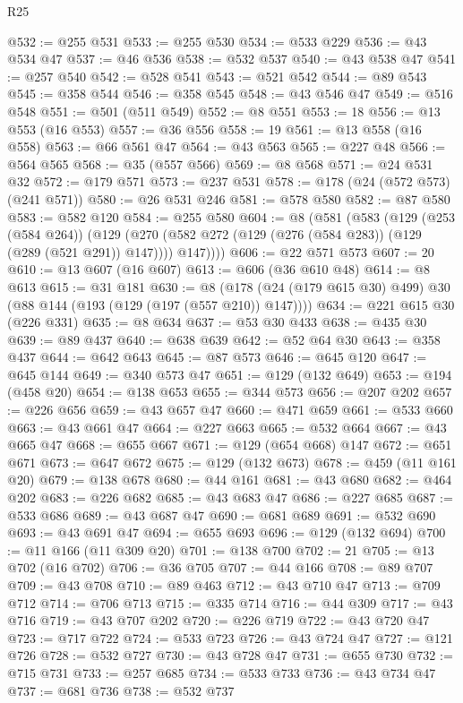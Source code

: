 \begin{lexlean}{R25}
\begin{coremodule}
@532 := @255 @531
@533 := @255 @530
@534 := @533 @229
@536 := @43 @534 @47
@537 := @46 @536
@538 := @532 @537
@540 := @43 @538 @47
@541 := @257 @540
@542 := @528 @541
@543 := @521 @542
@544 := @89 @543
@545 := @358 @544
@546 := @358 @545
@548 := @43 @546 @47
@549 := @516 @548
@551 := @501 (@511 @549)
@552 := @8 @551
@553 := 18
@556 := @13 @553 (@16 @553)
@557 := @36 @556
@558 := 19
@561 := @13 @558 (@16 @558)
@563 := @66 @561 @47
@564 := @43 @563
@565 := @227 @48
@566 := @564 @565
@568 := @35 (@557 @566)
@569 := @8 @568
@571 := @24 @531 @32
@572 := @179 @571
@573 := @237 @531
@578 := @178 (@24 (@572 @573) (@241 @571))
@580 := @26 @531 @246
@581 := @578 @580
@582 := @87 @580
@583 := @582 @120
@584 := @255 @580
@604 := @8
    (@581
      (@583
        (@129
          (@253 (@584 @264))
          (@129 (@270 (@582 @272 (@129 (@276 (@584 @283)) (@129 (@289 (@521 @291)) @147)))) @147))))
@606 := @22 @571 @573
@607 := 20
@610 := @13 @607 (@16 @607)
@613 := @606 (@36 @610 @48)
@614 := @8 @613
@615 := @31 @181
@630 := @8 (@178 (@24 (@179 @615 @30) @499) @30 (@88 @144 (@193 (@129 (@197 (@557 @210)) @147))))
@634 := @221 @615 @30 (@226 @331)
@635 := @8 @634
@637 := @53 @30 @433
@638 := @435 @30
@639 := @89 @437
@640 := @638 @639
@642 := @52 @64 @30
@643 := @358 @437
@644 := @642 @643
@645 := @87 @573
@646 := @645 @120
@647 := @645 @144
@649 := @340 @573 @47
@651 := @129 (@132 @649)
@653 := @194 (@458 @20)
@654 := @138 @653
@655 := @344 @573
@656 := @207 @202
@657 := @226 @656
@659 := @43 @657 @47
@660 := @471 @659
@661 := @533 @660
@663 := @43 @661 @47
@664 := @227 @663
@665 := @532 @664
@667 := @43 @665 @47
@668 := @655 @667
@671 := @129 (@654 @668) @147
@672 := @651 @671
@673 := @647 @672
@675 := @129 (@132 @673)
@678 := @459 (@11 @161 @20)
@679 := @138 @678
@680 := @44 @161
@681 := @43 @680
@682 := @464 @202
@683 := @226 @682
@685 := @43 @683 @47
@686 := @227 @685
@687 := @533 @686
@689 := @43 @687 @47
@690 := @681 @689
@691 := @532 @690
@693 := @43 @691 @47
@694 := @655 @693
@696 := @129 (@132 @694)
@700 := @11 @166 (@11 @309 @20)
@701 := @138 @700
@702 := 21
@705 := @13 @702 (@16 @702)
@706 := @36 @705
@707 := @44 @166
@708 := @89 @707
@709 := @43 @708
@710 := @89 @463
@712 := @43 @710 @47
@713 := @709 @712
@714 := @706 @713
@715 := @335 @714
@716 := @44 @309
@717 := @43 @716
@719 := @43 @707 @202
@720 := @226 @719
@722 := @43 @720 @47
@723 := @717 @722
@724 := @533 @723
@726 := @43 @724 @47
@727 := @121 @726
@728 := @532 @727
@730 := @43 @728 @47
@731 := @655 @730
@732 := @715 @731
@733 := @257 @685
@734 := @533 @733
@736 := @43 @734 @47
@737 := @681 @736
@738 := @532 @737

\end{coremodule}
\end{lexlean}
